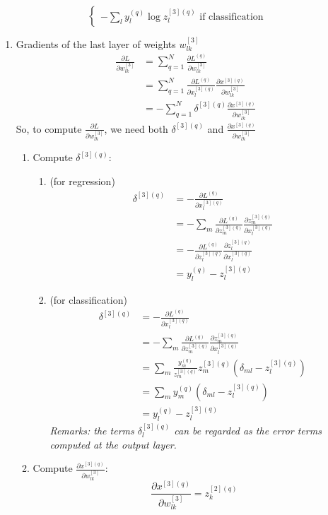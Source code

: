 \documentclass[11pt]{article}
\newcommand\pddx[2]{\frac{\partial{#1}}{\partial{#2}}}
\begin{document}
\begin{enumerate}
$$\begin{cases}
- \sum_{l} y_{l}^{(q)} \log z_{l}^{[3](q)} \text{ if classification}
\end{cases}$$
\begin{enumerate}
\item Gradients of the last layer of weights $w_{lk}^{[3]}$
\begin{align*}
\pddx{L}{w_{lk}^{[3]}} &= \sum_{q=1}^{N} \pddx{L^{(q)}}{w^{[3]}_{lk}}\\
&= \sum_{q=1}^{N} \pddx{L^{(q)}}{x_{l}^{[3](q)}} \pddx{x^{[3](q)}}{w^{[3]}_{lk}}\\
&= -\sum_{q=1}^{N} \delta^{[3](q)} \pddx{x^{[3](q)}}{w^{[3]}_{lk}}
\end{align*}
So, to compute $\pddx{L}{w_{lk}^{[3]}}$, we need both $\delta^{[3](q)}$ and $\pddx{x^{[3](q)}}{w^{[3]}_{lk}}$
\begin{enumerate}
\item Compute $\delta^{[3](q)}$:
\begin{enumerate}
\item[](for regression)
\begin{align*}
\delta^{[3](q)} &= -\pddx{L^{(q)}}{x_{l}^{[3](q)}}\\
&= -\sum_{m} \pddx{L^{(q)}}{z_{m}^{[3](q)}} \pddx{z_{m}^{[3](q)}}{x_{l}^{[3](q)}}\\
&= - \pddx{L^{(q)}}{z_{l}^{[3](q)}} \pddx{z^{[3](q)}_l}{x^{[3](q)}_{l}}\\
&= y^{(q)}_{l} - z^{[3](q)}_{l}
\end{align*}
\item[] (for classification) 
\begin{align*}
\delta^{[3](q)} &= -\pddx{L^{(q)}}{x_{l}^{[3](q)}} \\
&= -\sum_{m} \pddx{L^{(q)}}{z_{m}^{[3](q)}} \pddx{z_{m}^{[3](q)}}{x_{l}^{[3](q)}}\\
&= \sum_{m} \frac{y_{m}^{(q)}}{z_{m}^{[3](q)}} z^{[3](q)}_{m} (\delta_{ml} - z_{l}^{[3](q)})\\
&= \sum_{m} y_{m}^{(q)} (\delta_{ml} - z_{l}^{[3](q)}) \\
&= y_{l}^{(q)} - z_{l}^{[3](q)}
\end{align*}
\textit{Remarks: the terms $\delta_l ^{[3](q)}$ can be regarded as the error terms computed at the output layer.}
\end{enumerate}
\item Compute $\pddx{x^{[3](q)}}{w^{[3]}_{lk}}$:
$$\pddx{x^{[3](q)}}{w^{[3]}_{lk}} = z_{k}^{[2](q)}$$
\end{enumerate}


\end{enumerate}
\end{enumerate}
\end{document}
